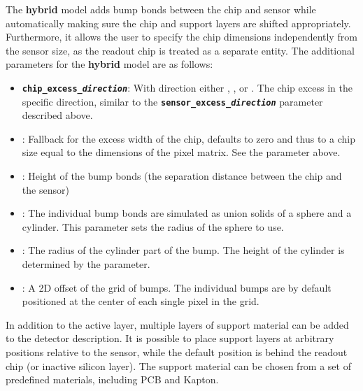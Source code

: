 The \textbf{hybrid} model adds bump bonds between the chip and sensor while automatically making sure the chip and support layers are shifted appropriately.
Furthermore, it allows the user to specify the chip dimensions independently from the sensor size, as the readout chip is treated as a separate entity.
The additional parameters for the \textbf{hybrid} model are as follows:
\begin{itemize}
\item \texttt{\textbf{chip\_excess\_\textit{direction}}}: With direction either , ,  or .
The chip excess in the specific direction, similar to the \texttt{\textbf{sensor\_excess\_\textit{direction}}} parameter described above.
\item {}: Fallback for the excess width of the chip, defaults to zero and thus to a chip size equal to the dimensions of the pixel matrix.
See the  parameter above.
\item {}: Height of the bump bonds (the separation distance between the chip and the sensor)
\item {}: The individual bump bonds are simulated as union solids of a sphere and a cylinder.
This parameter sets the radius of the sphere to use.
\item {}: The radius of the cylinder part of the bump.
The height of the cylinder is determined by the  parameter.
\item {}: A 2D offset of the grid of bumps.
The individual bumps are by default positioned at the center of each single pixel in the grid.
\end{itemize}


\label{sec:support_layers}
In addition to the active layer, multiple layers of support material can be added to the detector description.
It is possible to place support layers at arbitrary positions relative to the sensor, while the default position is behind the readout chip (or inactive silicon layer).
The support material can be chosen from a set of predefined materials, including PCB and Kapton.

